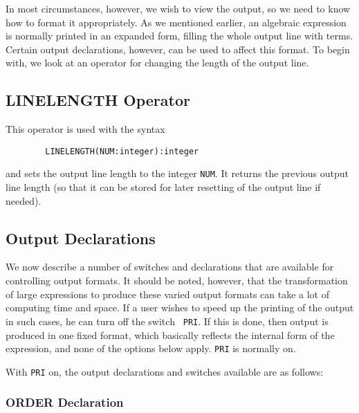 In most circumstances, however, we wish to view the output, so we need to
know how to format it appropriately.  As we mentioned earlier, an
algebraic expression is normally printed in an expanded form, filling the
whole output line with terms.  Certain output declarations, however, can be used to affect this format.  To begin with,
we look at an operator for changing the length of the output line.

\subsection{LINELENGTH Operator}
\hypertarget{operator:LINELENGTH}{}

This operator is used with the syntax
\begin{verbatim}
        LINELENGTH(NUM:integer):integer
\end{verbatim}
and sets the output line length to the integer {\tt NUM}. It returns the
previous output line length (so that it can be stored for later resetting
of the output line if needed).

\subsection{Output Declarations}
\hypertarget{switch:PRI}{}

We now describe a number of switches and declarations that are available
for controlling output formats. It should be noted, however, that the
transformation of large expressions to produce these varied output formats
can take a lot of computing time and space. If a user wishes to speed up
the printing of the output in such cases, he can turn off the switch {\tt
PRI}. If this is done, then output is produced in one fixed
format, which basically reflects the internal form of the expression, and
none of the options below apply. {\tt PRI} is normally on.

With {\tt PRI} on, the output declarations
and switches available are as follows:

\subsubsection{ORDER Declaration}
\hypertarget{command:ORDER}{}

